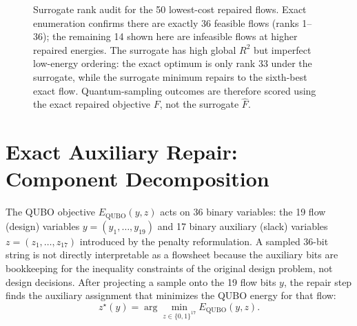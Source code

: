 \documentclass[10pt,letterpaper]{article}
\begin{document}
\begin{figure}[t]
\centering
{}
\caption{Surrogate rank audit for the 50 lowest-cost repaired flows.
Exact enumeration confirms there are exactly 36 feasible flows (ranks 1--36); the remaining 14 shown here are infeasible flows at higher repaired energies.
The surrogate has high global $R^2$ but imperfect low-energy ordering: the exact optimum is only rank 33 under the surrogate, while the surrogate minimum repairs to the sixth-best exact flow.
Quantum-sampling outcomes are therefore scored using the exact repaired objective $F$, not the surrogate $\widehat F$.}
\label{fig:supp-surrogate-rank}
\end{figure}

\clearpage

\section{Exact Auxiliary Repair: Component Decomposition}
\label{sec:supp-aux-repair}

The QUBO objective $E_{\mathrm{QUBO}}(y,z)$ acts on 36 binary variables: the 19 flow (design) variables $y=(y_1,\ldots,y_{19})$ and 17 binary auxiliary (slack) variables $z=(z_1,\ldots,z_{17})$ introduced by the penalty reformulation.
A sampled 36-bit string is not directly interpretable as a flowsheet because the auxiliary bits are bookkeeping for the inequality constraints of the original design problem, not design decisions.
After projecting a sample onto the 19 flow bits $y$, the repair step finds the auxiliary assignment that minimizes the QUBO energy for that flow:
\begin{equation}
z^\star(y) = \arg\min_{z \in \{0,1\}^{17}} E_{\mathrm{QUBO}}(y, z).
\label{eq:supp-repair}
\end{equation}
\end{document}
